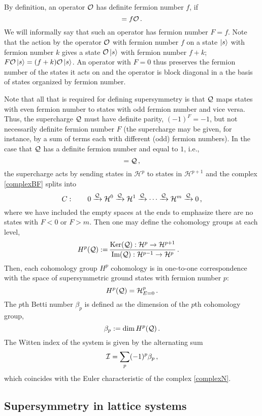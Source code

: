 \documentclass[11pt]{article}
\numberwithin{equation}{section}
\def\cI{{\cal I}}
\def\cO{{\cal O}}
\def\cQ{{\cal Q}}
\newcommand\equ[1] {\begin{equation}#1\end{equation}}
\newcommand\eqs[1] {\begin{align}#1\end{align}}
\renewcommand\( {\left(}
\renewcommand\) {\right)}
\def\cH{\mathcal H}
\begin{document}
By definition, an operator $\cO$ has definite fermion number $f$, if
\equ{
[F,\cO]= f \cO\,.
}
We will informally say that such an operator has fermion number $F=f$. Note that the action by the operator $\cO$ with fermion number $f$ on a state $\ket{s}$ with fermion number $k$ gives a state $\cO\ket{s}$ with fermion number $f+k$; $F \cO\ket{s}=(f+k)\cO\ket{s}$. An operator with $F=0$ thus preserves the fermion number of the states it acts on and the operator is block diagonal in a the basis of states organized by fermion number.



Note that all that is required for defining supersymmetry is that $\cQ$ maps states with even fermion number to states with odd fermion number and vice versa. Thus, the supercharge $\cQ$ must have definite parity, $(-1)^{F}=-1$, but not necessarily definite fermion number $F$ (the supercharge may be given, for instance, by a sum of terms each with different (odd) fermion numbers). In the case that $\cQ$ has  a definite fermion number and equal to $1$, i.e., 
\equ{
[F,\cQ]=\cQ\,,
}
the supercharge acts by sending states in $\cH^{p} $ to states in $\cH^{p+1}$ and the complex \eqref{complexBF} splits into
\equ{\label{complexN}
C:\qquad 0\xrightarrow{\cQ}\cH^{0}\xrightarrow{\cQ}\cH^{1}\xrightarrow{\cQ} \cdots \xrightarrow{\cQ}\cH^{m}\xrightarrow{\cQ}0 \,,
}
where we have included the empty spaces at the ends to emphasize there are no states with $F<0$ or $F>m$. Then one may define the cohomology groups at each level, 
\eqs{
H^{p}(\cQ):=\,& \frac{\text{Ker}(\cQ): \cH^{p}\to \cH^{p+1}}{\text{Im}(\cQ): \cH^{p-1}\to \cH^{p}}\,.
}
Then, each cohomology group $H^p$ cohomology is in one-to-one correspondence with the space of supersymmetric ground states with fermion number $p$:
\equ{
 H^p(\cQ)= \cH^p_{E=0}\,.
}
The $p$th Betti number $\beta_{p}$ is defined as the dimension of the $p$th cohomology group,
\equ{
\beta_{p}:= \dim H^{p}(\cQ)\,.
}
The Witten index of the system is given by the alternating sum
\equ{
\cI=\sum_p (-1)^p \beta_p\,,
}
which coincides with the  Euler characteristic of the complex \eqref{complexN}. 





\subsection{Supersymmetry in lattice systems}
\label{sec:Supersymmetry in lattice systems}
\end{document}
